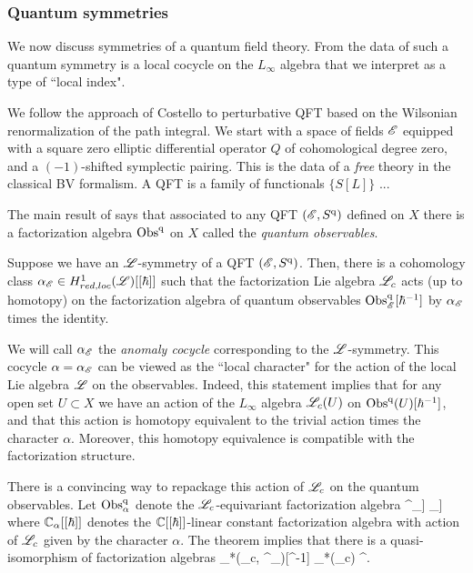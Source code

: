 \subsubsection{Quantum symmetries}

We now discuss symmetries of a quantum field theory.
From the data of such a quantum symmetry is a local cocycle on the $L_\infty$ algebra that we interpret as a type of ``local index".

We follow the approach of Costello \cite{Cosbook} to perturbative QFT based on the Wilsonian renormalization of the path integral.
We start with a space of fields $\mathscr E$ equipped with a square zero elliptic differential operator $Q$ of cohomological degree zero, and a $(-1)$-shifted symplectic pairing.
This is the data of a {\em free} theory in the classical BV formalism.
A QFT is a family of functionals $\{S[L]\}$ ...

The main result of \cite{CG2} says that associated to any QFT $(\mathscr E, S^{\rm q})$ defined on $X$ there is a factorization algebra ${\rm Obs}^{\rm q}$ on $X$ called the {\em quantum observables}. 

\begin{thm}
Suppose we have an $\mathscr L$-symmetry of a QFT $(\mathscr E, S^{\rm q})$. 
Then, there is a cohomology class $\alpha_\mathscr E \in H^1_{red,loc}(\mathscr L)[[\hbar]]$ such that the factorization Lie algebra $\mathscr L_c$ acts (up to homotopy) on the factorization algebra of quantum observables ${\rm Obs}_{\mathscr E}^{\rm q}[\hbar^{-1}]$ by $\alpha_\mathscr E$ times the identity.
\end{thm}

We will call $\alpha_{\mathscr E}$ the {\em anomaly cocycle} corresponding to the $\mathscr L$-symmetry.
This cocycle $\alpha = \alpha_{\mathscr E}$ can be viewed as the ``local character" for the action of the local Lie algebra $\mathscr L$ on the observables.
Indeed, this statement implies that for any open set $U \subset X$ we have an action of the $L_\infty$ algebra $\mathscr L_c(U)$ on ${\rm Obs}^{\rm q}(U)[\hbar^{-1}]$, and that this action is homotopy equivalent to the trivial action times the character $\alpha$. 
Moreover, this homotopy equivalence is compatible with the factorization structure. 

There is a convincing way to repackage this action of $\mathscr L_c$ on the quantum observables. 
Let ${\rm Obs}^{\rm q}_{\alpha}$ denote the $\mathscr L_c$-equivariant factorization algebra
\ben
\Obs^\q \tensor_{\CC[[\hbar]]} {\ul \CC}_\alpha [[\hbar]]
\een
where $\mathbb C_\alpha[[\hbar]]$ denotes the $\mathbb C[[\hbar]]$-linear constant factorization algebra with action of $\mathscr L_c$ given by the character $\alpha$. 
The theorem implies that there is a quasi-isomorphism of factorization algebras
\ben
\clieu_*(\sL_c, \Obs^\q_\alpha)[\hbar^{-1}] \simeq \clieu_*(\sL_c) \tensor \Obs^\q[\hbar^{-1}] .
\een


